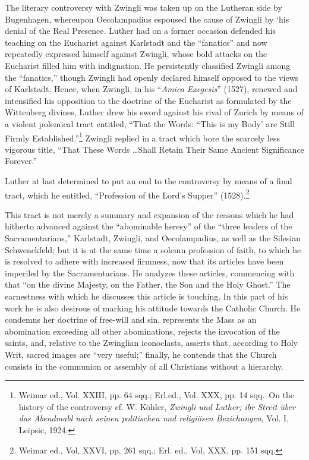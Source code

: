 The literary controversy with Zwingli was taken up on the
Lutheran side by Bugenhagen, whereupon Oecolampadius espoused the
cause of Zwingli by ‘his denial of the Real Presence. Luther had on a
former occasion defended his teaching on the Eucharist against
Karlstadt and the “fanatics” and now repeatedly expressed himself
against Zwingli, whose bold attacks on the Eucharist filled him with
indignation. He persistently classified Zwingli among the “fanatics,”
though Zwingli had openly declared himself opposed to the views
of Karlstadt. Hence, when Zwingli, in his ``\textit{Amica Exegesis}'' (1527),
renewed and intensified his opposition to the doctrine of the Eucharist
as formulated by the Wittenberg divines, Luther drew his sword
against his rival of Zurich by means of a violent polemical tract
entitled, “That the Words: “This is my Body’ are Still Firmly Established.”\footnote
{Weimar ed., Vol. XXIII, pp. 64 sqq.; Erl.ed., Vol. XXX, pp. 14 sqq.--On the history
of the controversy cf. W. Köhler, \textit{Zwingli und Luther; ibr Streit über das Abendmabl nach
seinen politischen und religiösen Bezichungen}, Vol. I, Leipsic, 1924.}
Zwingli replied in a tract which bore the scarcely less
vigorous title, “That These Words \dots Shall Retain Their Same
Ancient Significance Forever.”

Luther at last determined to put an end to the controversy by
means of a final tract, which he entitled, “Profession of the Lord’s
Supper” (1528).\footnote{Weimar ed., Vol, XXVI, pp. 261 sqq.; Erl. ed., Vol, XXX, pp. 151 sqq.}

This tract is not merely a summary and expansion of the reasons which he
had hitherto advanced against the “abominable heresy” of the “three leaders
of the Sacramentarians,” Karlstadt, Zwingli, and Oecolampadius, as well as
the Silesian Schwenckfeld; but it is at the same time a solemn profession of
faith, to which he is resolved to adhere with increased firmness, now that
its articles have been imperiled by the Sacramentarians. He analyzes these
articles, commencing with that “on the divine Majesty, on the Father, the
Son and the Holy Ghost.” The earnestness with which he discusses this
article is touching. In this part of his work he is also desirous of marking his
attitude towards the Catholic Church. He condemns her doctrine of free-will
and sin, represents the Mass as an abomination exceeding all other abominations,
rejects the invocation of the saints, and, relative to the Zwinglian
iconoclasts, asserts that, according to Holy Writ, sacred images are “very
useful;” finally, he contends that the Church consists in the communion or
assembly of all Christians without a hierarchy.


